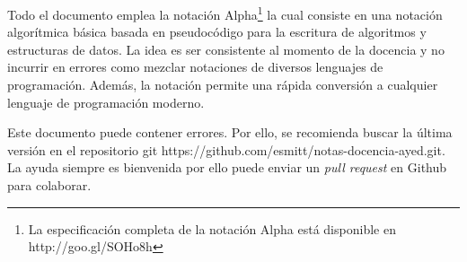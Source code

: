 Todo el documento emplea la notación Alpha\footnote{La especificación completa de la notación Alpha está disponible en http://goo.gl/SOHo8h} la cual consiste en una notación algorítmica básica basada en pseudocódigo para la escritura de algoritmos y estructuras de datos. La idea es ser consistente al momento de la docencia y no incurrir en errores como mezclar notaciones de diversos lenguajes de programación. Además, la notación permite una rápida conversión a cualquier lenguaje de programación moderno.

Este documento puede contener errores. Por ello, se recomienda buscar la última versión en el repositorio git https://github.com/esmitt/notas-docencia-ayed.git. La ayuda siempre es bienvenida por ello puede enviar un \textit{pull request} en Github para colaborar.